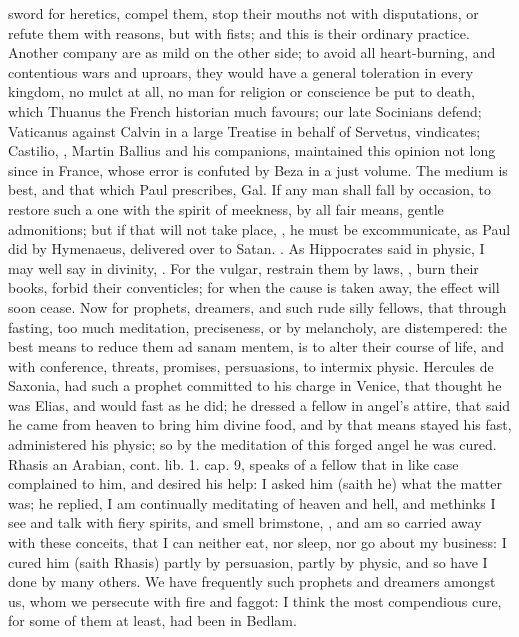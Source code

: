 {sword for heretics, compel them, stop their mouths not with
disputations, or refute them with reasons, but with fists; and this is
their ordinary practice. Another company are as mild on the other side;
to avoid all heart-burning, and contentious wars and uproars, they
would have a general toleration in every kingdom, no mulct at all, no
man for religion or conscience be put to death, which Thuanus the
French historian much favours; our late Socinians defend; Vaticanus
against Calvin in a large Treatise in behalf of Servetus, vindicates;
Castilio, \etc{}, Martin Ballius and his companions, maintained this
opinion not long since in France, whose error is confuted by Beza in a
just volume. The medium is best, and that which Paul prescribes, Gal.
 If any man shall fall by occasion, to restore such a one with the
spirit of meekness, by all fair means, gentle admonitions; but if that
will not take place, , he must be excommunicate, as Paul did by Hymenaeus, delivered
over to Satan. . As Hippocrates
said in physic, I may well say in divinity, . For the vulgar, restrain them by laws, , burn their
books, forbid their conventicles; for when the cause is taken away, the
effect will soon cease. Now for prophets, dreamers, and such rude silly
fellows, that through fasting, too much meditation, preciseness, or by
melancholy, are distempered: the best means to reduce them ad sanam
mentem, is to alter their course of life, and with conference, threats,
promises, persuasions, to intermix physic. Hercules de Saxonia, had
such a prophet committed to his charge in Venice, that thought he was
Elias, and would fast as he did; he dressed a fellow in angel's attire,
that said he came from heaven to bring him divine food, and by that
means stayed his fast, administered his physic; so by the meditation of
this forged angel he was cured. Rhasis an Arabian, cont. lib. 1.
cap. 9, speaks of a fellow that in like case complained to him, and
desired his help: I asked him (saith he) what the matter was; he
replied, I am continually meditating of heaven and hell, and methinks I
see and talk with fiery spirits, and smell brimstone, \etc{}, and am so
carried away with these conceits, that I can neither eat, nor sleep,
nor go about my business: I cured him (saith Rhasis) partly by
persuasion, partly by physic, and so have I done by many others. We
have frequently such prophets and dreamers amongst us, whom we
persecute with fire and faggot: I think the most compendious cure, for
some of them at least, had been in Bedlam. 

}

